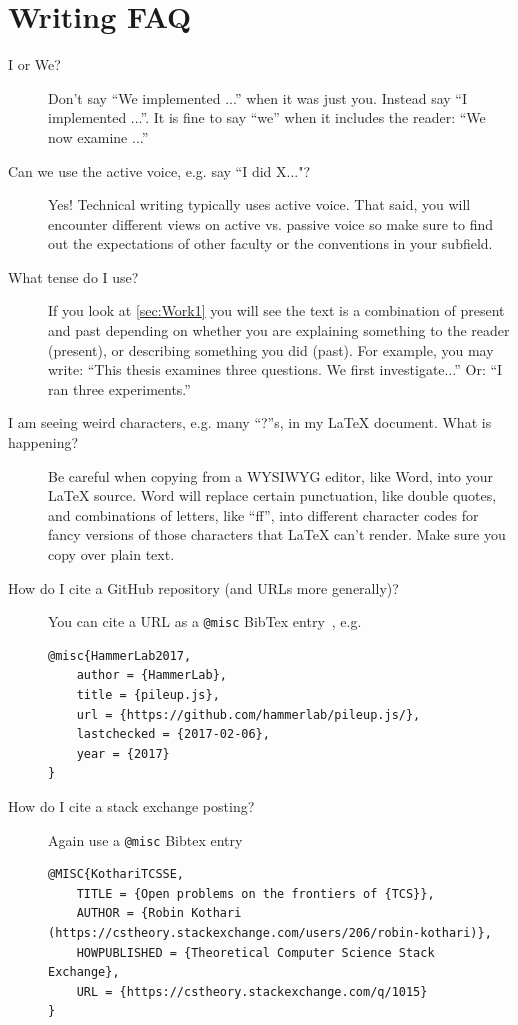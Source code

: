 \documentclass[midd]{thesis}
\begin{document}
\section{Writing FAQ}
\label{sec:FAQ}

\begin{description}
\item [I or We?] Don't say ``We implemented ...'' when it was just you. Instead say ``I implemented ...''.  It is fine to say ``we'' when it includes the reader: ``We now examine ...''
\item[Can we use the active voice, e.g. say ``I did X..."?] Yes! Technical writing typically uses active voice. That said, you will encounter different views on active vs. passive voice so make sure to find out the expectations of other faculty or the conventions in your subfield.
\item[What tense do I use?] If you look at \cref{sec:Work1} you will see the text is a combination of present and past depending on whether you are explaining something to the reader (present), or describing something you did (past). For example, you may write:  ``This thesis examines three questions.  We first investigate...'' Or: ``I ran three experiments.''
\item[I am seeing weird characters, e.g. many ``?''s, in my LaTeX document. What is happening?] Be careful when copying from a WYSIWYG editor, like Word, into your {\LaTeX} source. Word will replace certain punctuation, like double quotes, and combinations of letters, like ``ff'', into different character codes for fancy versions of those characters that {\LaTeX} can't render. Make sure you copy over plain text.
\item[How do I cite a GitHub repository (and URLs more generally)?] You can cite a URL as a {\tt @misc} BibTex entry~\cite{HammerLab2017}, e.g.
\begin{verbatim}
@misc{HammerLab2017,
    author = {HammerLab},
    title = {pileup.js},
    url = {https://github.com/hammerlab/pileup.js/},
    lastchecked = {2017-02-06},
    year = {2017}
}
\end{verbatim}

\item[How do I cite a stack exchange posting?] Again use a {\tt @misc} Bibtex entry~\cite{KothariTCSSE}
\begin{verbatim}
@MISC{KothariTCSSE,
    TITLE = {Open problems on the frontiers of {TCS}},
    AUTHOR = {Robin Kothari (https://cstheory.stackexchange.com/users/206/robin-kothari)},
    HOWPUBLISHED = {Theoretical Computer Science Stack Exchange},
    URL = {https://cstheory.stackexchange.com/q/1015}
}
\end{verbatim}



\end{description}


\printbibliography
\end{document}
